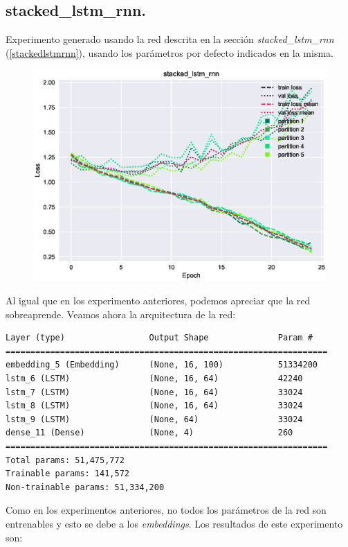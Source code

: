 \documentclass[11pt]{article}
\begin{document}
\subsection{stacked\_lstm\_rnn.} \label{exp_stackedlstmrnn}

Experimento generado usando la red descrita en la sección \textit{stacked\_lstm\_rnn} (\ref{stackedlstmrnn}), usando los parámetros por defecto indicados en la misma.

\begin{figure}[H]
\includegraphics[width=\linewidth]{images/loss/stacked_lstm_rnn-1554204631.eps}
\end{figure}

Al igual que en los experimento anteriores, podemos apreciar que la red sobreaprende. Veamos ahora la arquitectura de la red:

\begin{verbatim}
Layer (type)                 Output Shape              Param #   
=================================================================
embedding_5 (Embedding)      (None, 16, 100)           51334200  
lstm_6 (LSTM)                (None, 16, 64)            42240     
lstm_7 (LSTM)                (None, 16, 64)            33024     
lstm_8 (LSTM)                (None, 16, 64)            33024     
lstm_9 (LSTM)                (None, 64)                33024     
dense_11 (Dense)             (None, 4)                 260       
=================================================================
Total params: 51,475,772
Trainable params: 141,572
Non-trainable params: 51,334,200
\end{verbatim}

Como en los experimentos anteriores, no todos los parámetros de la red son entrenables y esto se debe a los \textit{embeddings}. Los resultados de este experimento son: 
\end{document}
